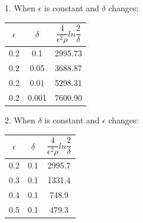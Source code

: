 \documentclass[11pt,a4paper,english]{article}
\begin{document}
\begin{enumerate}
\begin{enumerate}
            1. When $\epsilon$ is constant and $\delta$ changes:\\
            \begin{tabular}{c | c | c}
              $\epsilon$ & $\delta$ & $\dfrac{4}{\epsilon^2 \rho}ln\dfrac{2}{\delta}$ \\ \hline
              0.2  &  0.1     &   2995.73 \\
              0.2  &  0.05    &   3688.87 \\
              0.2  &  0.01    &   5298.31 \\
              0.2  &  0.001   &   7600.90 \\
            \end{tabular}

            2. When $\delta$ is constant and $\epsilon$ changes:\\
            \begin{tabular}{c | c | c}
              $\epsilon$ & $\delta$ & $\dfrac{4}{\epsilon^2 \rho}ln\dfrac{2}{\delta}$ \\ \hline
              0.2  &   0.1    &   2995.7 \\
              0.3  &   0.1    &   1331.4 \\
              0.4  &   0.1    &   748.9 \\
              0.5  &   0.1    &   479.3 \\
            \end{tabular}
        \end{enumerate}
    \end{enumerate}
\end{document}
